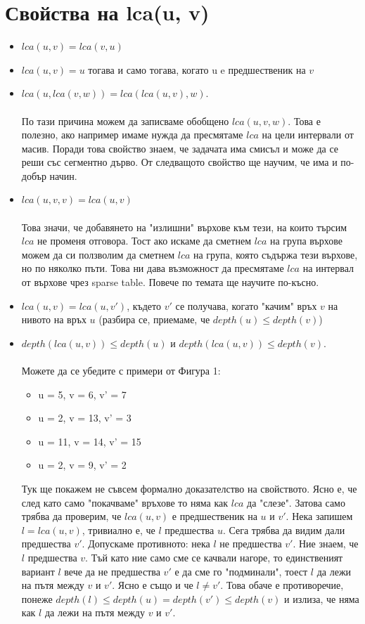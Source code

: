 \documentclass[12pt]{article}
\begin{document}
\section*{Свойства на lca(u, v)}
\begin{itemize}
	\item $lca(u, v) = lca(v, u)$
	\item $lca(u, v) = u$ тогава и само тогава, когато u e предшественик на $v$
	\item $lca(u, lca(v, w)) = lca(lca(u, v), w)$.
\paragraph*{}
По тази причина можем да записваме обобщено $lca(u, v, w)$. Това е полезно, ако например имаме нужда да пресмятаме $lca$ на цели интервали от масив. Поради това свойство знаем, че задачата има смисъл и може да се реши със сегментно дърво. От следващото свойство ще научим, че има и по-добър начин.
	\item $lca(u, v, v) = lca(u, v)$
\paragraph*{}
Това значи, че добавянето на "излишни" върхове към тези, на които търсим $lca$ не променя отговора. Тост ако искаме да сметнем $lca$ на група върхове можем да си ползволим да сметнем $lca$ на група, която съдържа тези върхове, но по няколко пъти. Това ни дава възможност да пресмятаме $lca$ на интервал от върхове чрез sparse table. Повече по темата ще научите по-късно.
	\item $lca(u, v) = lca(u, v')$, където $v'$ се получава, когато "качим" връх $v$ на нивото на връх $u$ (разбира се, приемаме, че $depth(u) \leq depth(v)$)
	\item $depth(lca(u, v)) \leq depth(u)$ и $depth(lca(u, v)) \leq depth(v)$.
\paragraph*{}
Можете да се убедите с примери от Фигура 1:
\begin{itemize}
	\item u = 5, v = 6, v' = 7
	\item u = 2, v = 13, v' = 3
	\item u = 11, v = 14, v' = 15
	\item u = 2, v = 9, v' = 2
\end{itemize} 
Тук ще покажем не съвсем формално доказателство на свойството. Ясно е, че след като само "покачваме" връхове то няма как $lca$ да "слезе". Затова само трябва да проверим, че $lca(u, v)$ е предшественик на $u$ и $v'$. Нека запишем $l = lca(u, v)$, тривиално е, че $l$ предшества $u$. Сега трябва да видим дали предшества $v'$. Допускаме противното: нека $l$ не предшества $v'$. Ние знаем, че $l$ предшества $v$. Тъй като ние само сме се качвали нагоре, то единственият вариант $l$ вече да не предшества $v'$ е да сме го "подминали", тоест $l$ да лежи на пътя между $v$ и $v'$. Ясно е също и че $l \neq v'$. Това обаче е противоречие, понеже $depth(l) \leq depth(u) = depth(v') \leq depth(v)$ и излиза, че няма как $l$ да лежи на пътя между $v$ и $v'$.
\end{itemize}
\end{document}
